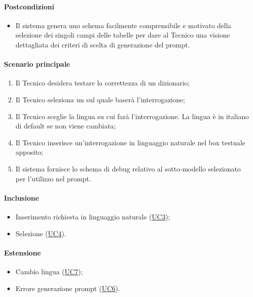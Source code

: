 \paragraph*{Postcondizioni}
\begin{itemize}
  \item Il sistema genera uno schema facilmente comprensibile e motivato della selezione dei singoli campi delle tabelle per dare al Tecnico una visione dettagliata dei criteri di scelta di generazione del prompt.
\end{itemize}

\paragraph*{Scenario principale}
\begin{enumerate}
  \item Il Tecnico desidera testare la correttezza di un dizionario; 
  \item Il Tecnico seleziona un  sul quale baserà l’interrogazione;
  \item Il Tecnico sceglie la lingua su cui farà l’interrogazione. La lingua è in italiano di default se non viene cambiata;
  \item Il Tecnico inserisce un’interrogazione in linguaggio naturale nel box testuale apposito;
  \item Il sistema fornisce lo schema di debug relativo al sotto-modello selezionato per l’utilizzo nel prompt.  
\end{enumerate}

\paragraph*{Inclusione}
\begin{itemize}
  \item Inserimento richiesta in linguaggio naturale (\hyperref[UC3]{UC3});
  \item Selezione  (\hyperref[UC4]{UC4}).
\end{itemize}

\paragraph*{Estensione}
\begin{itemize}
  \item Cambio lingua (\hyperref[UC7]{UC7});
  \item Errore generazione prompt (\hyperref[UC6]{UC6}).
\end{itemize}
